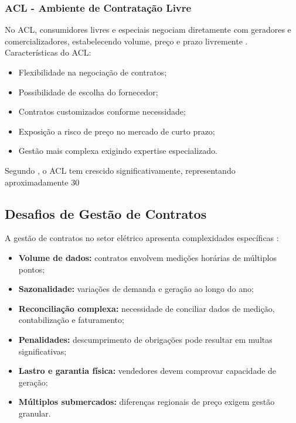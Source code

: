 \subsubsection{ACL - Ambiente de Contratação Livre}

No ACL, consumidores livres e especiais negociam diretamente com geradores e comercializadores, estabelecendo volume, preço e prazo livremente \cite{ccee2023}. Características do ACL:

\begin{itemize}
    \item Flexibilidade na negociação de contratos;
    \item Possibilidade de escolha do fornecedor;
    \item Contratos customizados conforme necessidade;
    \item Exposição a risco de preço no mercado de curto prazo;
    \item Gestão mais complexa exigindo expertise especializado.
\end{itemize}

Segundo \cite{brito2018}, o ACL tem crescido significativamente, representando aproximadamente 30%
\subsection{Desafios de Gestão de Contratos}

A gestão de contratos no setor elétrico apresenta complexidades específicas \cite{tolmasquim2016}:

\begin{itemize}
    \item \textbf{Volume de dados:} contratos envolvem medições horárias de múltiplos pontos;
    \item \textbf{Sazonalidade:} variações de demanda e geração ao longo do ano;
    \item \textbf{Reconciliação complexa:} necessidade de conciliar dados de medição, contabilização e faturamento;
    \item \textbf{Penalidades:} descumprimento de obrigações pode resultar em multas significativas;
    \item \textbf{Lastro e garantia física:} vendedores devem comprovar capacidade de geração;
    \item \textbf{Múltiplos submercados:} diferenças regionais de preço exigem gestão granular.
\end{itemize}

